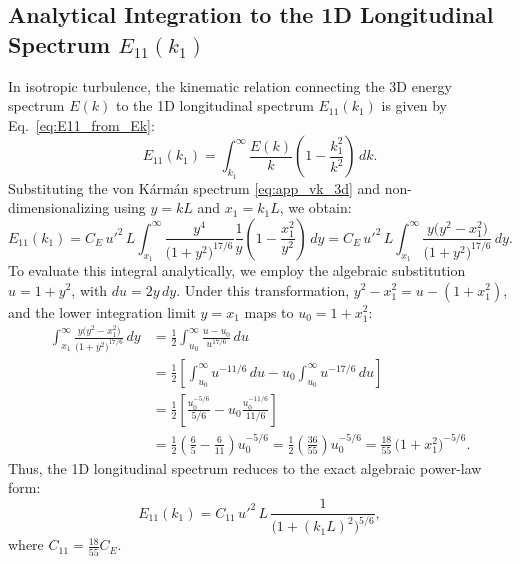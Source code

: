 \documentclass[lineno]{jfm}
\begin{document}
\subsection{Analytical Integration to the 1D Longitudinal Spectrum \texorpdfstring{$E_{11}(k_1)$}{E11(k1)}}
In isotropic turbulence, the kinematic relation connecting the 3D energy spectrum $E(k)$ to the 1D longitudinal spectrum $E_{11}(k_1)$ is given by Eq.~\eqref{eq:E11_from_Ek}:
\begin{equation}
E_{11}(k_1) = \int_{k_1}^\infty \frac{E(k)}{k}\left(1 - \frac{k_1^2}{k^2}\right)\,dk.
\end{equation}
Substituting the von K\'arm\'an spectrum \eqref{eq:app_vk_3d} and non-dimensionalizing using $y = kL$ and $x_1 = k_1 L$, we obtain:
\begin{equation}
E_{11}(k_1) = C_E\,u'^2\,L \int_{x_1}^\infty \frac{y^4}{\big(1 + y^2\big)^{17/6}} \frac{1}{y} \left(1 - \frac{x_1^2}{y^2}\right)\,dy = C_E\,u'^2\,L \int_{x_1}^\infty \frac{y\big(y^2 - x_1^2\big)}{\big(1 + y^2\big)^{17/6}}\,dy.
\end{equation}
To evaluate this integral analytically, we employ the algebraic substitution $u = 1 + y^2$, with $du = 2y\,dy$. Under this transformation, $y^2 - x_1^2 = u - (1 + x_1^2)$, and the lower integration limit $y = x_1$ maps to $u_0 = 1 + x_1^2$:
\begin{align}
\int_{x_1}^\infty \frac{y\big(y^2 - x_1^2\big)}{\big(1 + y^2\big)^{17/6}}\,dy 
&= \frac{1}{2} \int_{u_0}^\infty \frac{u - u_0}{u^{17/6}}\,du \nonumber \\
&= \frac{1}{2} \left[ \int_{u_0}^\infty u^{-11/6}\,du - u_0 \int_{u_0}^\infty u^{-17/6}\,du \right] \nonumber \\
&= \frac{1}{2} \left[ \frac{u_0^{-5/6}}{5/6} - u_0 \frac{u_0^{-11/6}}{11/6} \right] \nonumber \\
&= \frac{1}{2} \left( \frac{6}{5} - \frac{6}{11} \right) u_0^{-5/6} = \frac{1}{2} \left( \frac{36}{55} \right) u_0^{-5/6} = \frac{18}{55}\,\big(1 + x_1^2\big)^{-5/6}.
\end{align}
Thus, the 1D longitudinal spectrum reduces to the exact algebraic power-law form:
\begin{equation}
E_{11}(k_1) = C_{11}\,u'^2\,L\,\frac{1}{\big(1 + (k_1 L)^2\big)^{5/6}},
\label{eq:app_E11_form}
\end{equation}
where $C_{11} = \frac{18}{55} C_E$.
\end{document}
